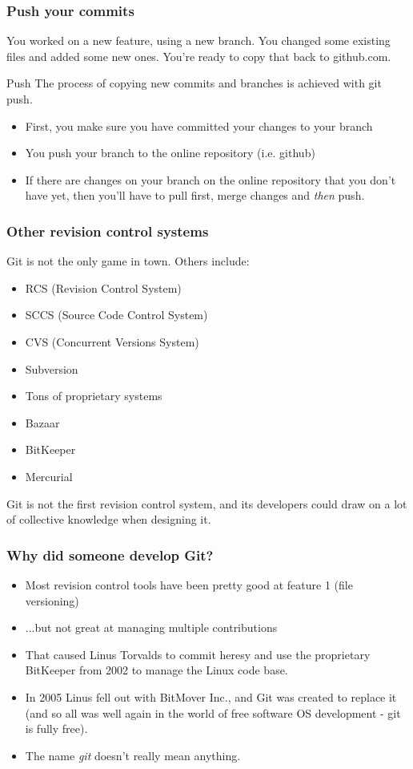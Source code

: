\documentclass{beamer}
\begin{document}
\begin{frame}
  \frametitle{Push your commits}
  You worked on a new feature, using a new branch. You changed some existing
  files and added some new ones. You're ready to copy that back to github.com.
  \begin{block}{Push}
    The process of copying new commits and branches is achieved with git \alert{push}.
    \begin{itemize}
    \item First, you make sure you have \alert{committed} your changes to your branch
    \item You \alert{push} your branch to the online repository (i.e. github)
    \item If there are changes on your branch on the online repository that you don't
      have yet, then you'll have to pull first, \alert{merge} changes and
      \emph{then} push.
    \end{itemize}
  \end{block}
\end{frame}

\begin{frame}
  \frametitle{Other revision control systems}
  Git is not the only game in town. Others include:

  \begin{itemize}
  \item RCS (Revision Control System)
  \item SCCS (Source Code Control System)
  \item CVS (Concurrent Versions System)
  \item Subversion
  \item Tons of proprietary systems
  \item Bazaar
  \item BitKeeper
  \item Mercurial
  \end{itemize}

  \pause Git is not the first revision control system, and its
  developers could draw on a lot of collective knowledge when
  designing it.
\end{frame}

\begin{frame}
  \frametitle{Why did someone develop Git?}
  \begin{itemize}
    \pause \item Most revision control tools have been pretty good at
    feature 1 (file versioning)
    \pause \item ...but not great at managing multiple contributions
    \pause \item That caused Linus Torvalds to commit heresy and use the
    \alert{proprietary} BitKeeper from 2002 to manage the Linux code base.
    \pause \item In 2005 Linus fell out with BitMover Inc., and Git was
    created to replace it (and so all was well again in the world of free
    software OS development - git is fully free).
    \pause \item The name \emph{git} doesn't really mean anything.
  \end{itemize}
\end{frame}
\end{document}
